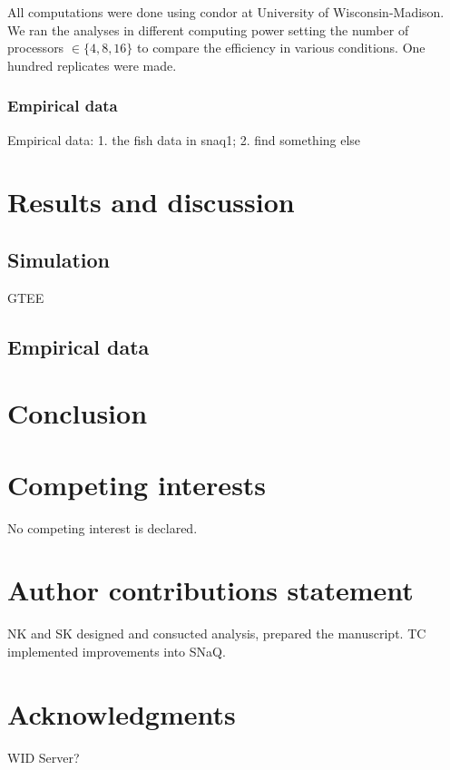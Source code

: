 \documentclass[unnumsec,webpdf,contemporary,large]{oup-authoring-template}%
\theoremstyle{thmstyleone}%
\theoremstyle{thmstyletwo}%
\theoremstyle{thmstylethree}%
\begin{document}
All computations were done using condor at University of Wisconsin-Madison. We ran the analyses in different computing power setting the number of processors $\in\{4,8,16\}$ to compare the efficiency in various conditions. One hundred replicates were made.



\subsubsection{Empirical data}

Empirical data: 1. the fish data in snaq1; 2. find something else

\section{Results and discussion}\label{sec3}
\subsection{Simulation}\label{subsec4}
GTEE
\subsection{Empirical data}\label{subsec5}

\section{Conclusion}\label{sec4}

\section{Competing interests}
No competing interest is declared.

\section{Author contributions statement}
NK and SK designed and consucted analysis, prepared the manuscript. TC implemented improvements into SNaQ. 

\section{Acknowledgments}
WID Server? 

%
%


\end{document}
